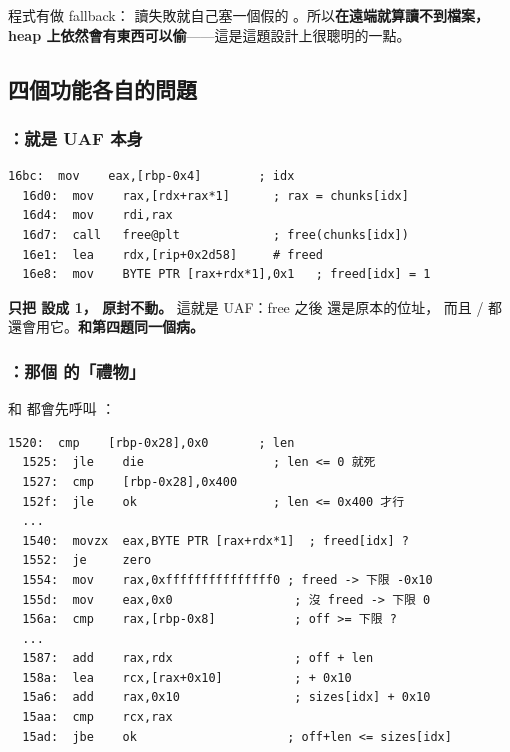 \begin{keybox}[如果檔案不存在呢]
程式有做 fallback： 讀失敗就自己塞一個假的
。所以\textbf{在遠端就算讀不到檔案，
heap 上依然會有東西可以偷}——這是這題設計上很聰明的一點。
\end{keybox}

\subsection{四個功能各自的問題}

\subsubsection{：就是 UAF 本身}

\begin{lstlisting}[style=asm]
  16bc:  mov    eax,[rbp-0x4]        ; idx
  16d0:  mov    rax,[rdx+rax*1]      ; rax = chunks[idx]
  16d4:  mov    rdi,rax
  16d7:  call   free@plt             ; free(chunks[idx])
  16e1:  lea    rdx,[rip+0x2d58]     # freed
  16e8:  mov    BYTE PTR [rax+rdx*1],0x1   ; freed[idx] = 1
\end{lstlisting}

\textbf{只把  設成 1， 原封不動。}
這就是 UAF：free 之後  還是原本的位址，
而且 / 都還會用它。\textbf{和第四題同一個病。}

\subsubsection{：那個  的「禮物」}

 和  都會先呼叫 ：

\begin{lstlisting}[style=asm]
  1520:  cmp    [rbp-0x28],0x0       ; len
  1525:  jle    die                  ; len <= 0 就死
  1527:  cmp    [rbp-0x28],0x400
  152f:  jle    ok                   ; len <= 0x400 才行
  ...
  1540:  movzx  eax,BYTE PTR [rax+rdx*1]  ; freed[idx] ?
  1552:  je     zero
  1554:  mov    rax,0xfffffffffffffff0 ; freed -> 下限 -0x10
  155d:  mov    eax,0x0                 ; 沒 freed -> 下限 0
  156a:  cmp    rax,[rbp-0x8]           ; off >= 下限 ?
  ...
  1587:  add    rax,rdx                 ; off + len
  158a:  lea    rcx,[rax+0x10]          ; + 0x10
  15a6:  add    rax,0x10                ; sizes[idx] + 0x10
  15aa:  cmp    rcx,rax
  15ad:  jbe    ok                     ; off+len <= sizes[idx]
\end{lstlisting}


